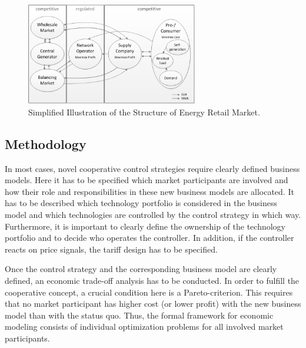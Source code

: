 \documentclass[review]{elsarticle}
\begin{document}
\begin{figure}[t]
  \centering
  \includegraphics[width=75mm]{figures/market_structure.png}
  \caption{Simplified Illustration of the Structure of Energy Retail
    Market.}
  \label{fig:market_structure}
\end{figure}

\subsection{Methodology}
\label{sec:econ-2}
\noindent
In most cases, novel cooperative control strategies require clearly
defined business models. Here it has to be specified which market
participants are involved and how their role and responsibilities in
these new business models are allocated. It has to be described which
technology portfolio is considered in the business model and which
technologies are controlled by the control strategy in which
way. Furthermore, it is important to clearly define the ownership of
the technology portfolio
and to decide who operates the controller. 
In addition,
if the controller reacts on price signals, the tariff design has to be
specified.

Once the control strategy and the corresponding business model are
clearly defined, an economic trade-off analysis 
has to be conducted. In order to fulfill the cooperative
concept, a  crucial condition here is a Pareto-criterion. This
requires that no market participant has higher cost (or lower profit)
with the new business model
than with the status quo. Thus, the formal framework for economic
modeling consists of individual optimization problems for all
involved market participants. 
\end{document}
